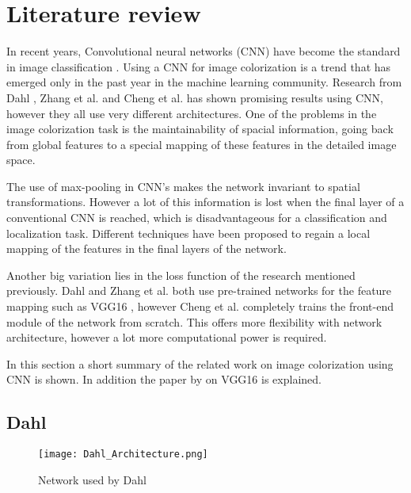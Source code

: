 \section{Literature review} \label{sec:litreview}


In recent years, Convolutional neural networks (CNN) have become the standard in image
classification \cite{Krizhevsky}. Using a CNN for image colorization is a trend that has emerged only in the past year in the machine learning community. Research from Dahl \cite{Dahl}, Zhang et al. \cite{Zhang}
and Cheng et al. \cite{Cheng} has shown promising results using CNN, however they all use very different
architectures. One of the problems in the image colorization task is the maintainability of spacial information, going back from global features to a special mapping of these features in the detailed image space. 

The use of max-pooling in CNN's makes the network invariant to spatial transformations. However a lot of this information is lost when the final layer of a conventional CNN is reached, which is disadvantageous for a classification and localization task. Different techniques have been proposed to regain a local mapping of the features in the final layers of the network. 

Another big variation lies in the loss function of the research mentioned previously. Dahl \cite{Dahl} and Zhang et al. \cite{Zhang} both use pre-trained networks for the feature mapping such as VGG16 \cite{Simonyan}, however Cheng et al. \cite{Cheng} completely trains the front-end module of the network from scratch. This offers more flexibility with network architecture, however a lot more computational power is required. 

In this section a short summary of the related work on image colorization using CNN is shown. In addition the paper by \cite{Simonyan} on VGG16 is explained.

\subsection{Dahl}

\begin{wrapfigure}{R}{0.4\textwidth}
	\vspace{-20pt}
	\begin{center}
		\texttt{[image: Dahl\_Architecture.png]}
	\end{center}
	\caption{Network used by Dahl \cite{Dahl}}
	\label{fig:dahlnetwork}
\end{wrapfigure}


